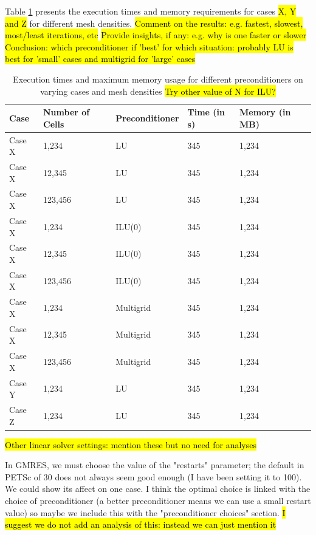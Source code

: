 \documentclass[sn-mathphys,Numbered,draft]{sn-jnl}%
\begin{document}
Table \ref{tab:preconditioner} presents the execution times and memory requirements for cases \hl{X, Y and Z} for different mesh densities.
\hl{Comment on the results: e.g. fastest, slowest, most/least iterations, etc}
\hl{Provide insights, if any: e.g. why is one faster or slower}
\hl{Conclusion: which preconditioner if 'best' for which situation: probably LU is best for 'small' cases and multigrid for 'large' cases}
\begin{table}[htb]
	\centering
		\begin{tabular}{lllll}
			\hline
			Case & Number of Cells & Preconditioner & Time (in s) & Memory (in MB)  \\
			\hline 
			Case X & 1,234 & LU & 345 & 1,234  \\
			Case X & 12,345 & LU & 345 & 1,234  \\
			Case X & 123,456 & LU & 345 & 1,234  \\
			Case X & 1,234 & ILU(0) & 345 & 1,234  \\
			Case X & 12,345 & ILU(0) & 345 & 1,234  \\
			Case X & 123,456 & ILU(0) & 345 & 1,234  \\
			Case X & 1,234 & Multigrid & 345 & 1,234  \\
			Case X & 12,345 & Multigrid & 345 & 1,234  \\
			Case X & 123,456 & Multigrid & 345 & 1,234  \\
			Case Y & 1,234 & LU & 345 & 1,234  \\
			Case Z & 1,234 & LU & 345 & 1,234  \\
			\hline
		\end{tabular}
	\caption{Execution times and maximum memory usage for different preconditioners on varying cases and mesh densities \hl{Try other value of N for ILU?}}
	\label{tab:preconditioner}
\end{table}


\hl{Other linear solver settings: mention these but no need for analyses}

In GMRES, we must choose the value of the "restarts" parameter; the default in PETSc of 30 does not always seem good enough (I have been setting it to 100). We could show its affect on one case. I think the optimal choice is linked with the choice of preconditioner (a better preconditioner means we can use a small restart value) so maybe we include this with the "preconditioner choices" section.
\hl{I suggest we do not add an analysis of this: instead we can just mention it}
\end{document}

